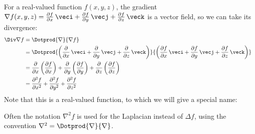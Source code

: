 For a real-valued function $f(x,y,z)$, the gradient $\nabla f(x,y,z) =\frac{\partial f}{\partial x}\,\veci + \frac{\partial f}{\partial y}\,\vecj + \frac{\partial f}{\partial z}\,\veck$ is a vector field, so we can take its divergence:
\begin{align*}
 \Div\nabla f &= \Dotprod{\nabla}{\nabla f}\\
  &= \Dotprod{ \left( \frac{\partial}{\partial x}\,\veci + \frac{\partial}{\partial y}\,\vecj +
  \frac{\partial}{\partial z}\,\veck \right) }{\left( \frac{\partial f}{\partial x}\,\veci +
  \frac{\partial f}{\partial y}\,\vecj + \frac{\partial f}{\partial z}\,\veck \right) }\\
  &= \frac{\partial}{\partial x}\left( \frac{\partial f}{\partial x} \right) +
   \frac{\partial}{\partial y}\left( \frac{\partial f}{\partial y} \right) +
   \frac{\partial}{\partial z}\left( \frac{\partial f}{\partial z} \right)\\
  &= \frac{\partial^2 f}{\partial x^2} + \frac{\partial^2 f}{\partial y^2} + \frac{\partial^2 f}{\partial z^2}
\end{align*}
Note that this is a real-valued function, to which we will give a special name:


Often the notation $\nabla^2 f$ is used for the Laplacian instead of $\Delta f$, using the convention $\nabla^2 = \Dotprod{\nabla}{\nabla}$.\index{$\Delta$}


